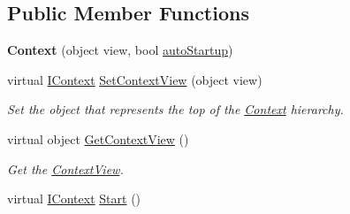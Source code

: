 \subsection*{Public Member Functions}
\begin{DoxyCompactItemize}
\item 
\hypertarget{classstrange_1_1extensions_1_1context_1_1impl_1_1_context_a771c415dd8d8ee10fa09d5906318ff9c}{{\bfseries Context} (object view, bool \hyperlink{classstrange_1_1extensions_1_1context_1_1impl_1_1_context_a3386ea2967ba720218b89eaefac77d56}{auto\-Startup})}\label{classstrange_1_1extensions_1_1context_1_1impl_1_1_context_a771c415dd8d8ee10fa09d5906318ff9c}

\item 
virtual \hyperlink{interfacestrange_1_1extensions_1_1context_1_1api_1_1_i_context}{I\-Context} \hyperlink{classstrange_1_1extensions_1_1context_1_1impl_1_1_context_a376f83ac4bf2233eedbc760f1aeddccd}{Set\-Context\-View} (object view)
\begin{DoxyCompactList}\small\item\em Set the object that represents the top of the \hyperlink{classstrange_1_1extensions_1_1context_1_1impl_1_1_context}{Context} hierarchy. \end{DoxyCompactList}\item 
\hypertarget{classstrange_1_1extensions_1_1context_1_1impl_1_1_context_a125ee92dbe4061fcc181e74215462699}{virtual object \hyperlink{classstrange_1_1extensions_1_1context_1_1impl_1_1_context_a125ee92dbe4061fcc181e74215462699}{Get\-Context\-View} ()}\label{classstrange_1_1extensions_1_1context_1_1impl_1_1_context_a125ee92dbe4061fcc181e74215462699}

\begin{DoxyCompactList}\small\item\em Get the \hyperlink{classstrange_1_1extensions_1_1context_1_1impl_1_1_context_view}{Context\-View}. \end{DoxyCompactList}\item 
\hypertarget{classstrange_1_1extensions_1_1context_1_1impl_1_1_context_a29da25935b72076b614409b2a3bf5ba0}{virtual \hyperlink{interfacestrange_1_1extensions_1_1context_1_1api_1_1_i_context}{I\-Context} \hyperlink{classstrange_1_1extensions_1_1context_1_1impl_1_1_context_a29da25935b72076b614409b2a3bf5ba0}{Start} ()}\label{classstrange_1_1extensions_1_1context_1_1impl_1_1_context_a29da25935b72076b614409b2a3bf5ba0}


\end{DoxyCompactItemize}
